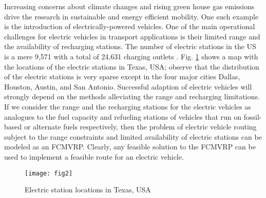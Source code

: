 \documentclass[letterpaper, 10pt, conference]{ieeeconf}
\begin{document}
Increasing concerns about climate changes and rising green house gas emissions drive the research in sustainable and energy efficient mobility. One such example is the introduction of electrically-powered vehicles. One of the main operational challenges for electric vehicles in transport applications is their limited range and the availability of recharging stations. The number of electric stations in the US is a mere 9,571 with a total of 24,631 charging outlets \cite{USDOE}. Fig. \ref{fig:map} shows a map with the locations of the electric stations in Texas, USA; observe that the distribution of the electric stations is very sparse except in the four major cities Dallas, Houston, Austin, and San Antonio. Successful adaption of electric vehicles will strongly depend on the methods alleviating the range and recharging limitations. If we consider the range and the recharging stations for the electric vehicles as analogues to the fuel capacity and refueling stations of vehicles that run on fossil-based or alternate fuels respectively, then the problem of electric vehicle routing subject to the range constraints and limited availability of electric stations can be modeled as an FCMVRP. Clearly, any feasible solution to the FCMVRP can be used to implement a feasible route for an electric vehicle. 

\begin{figure}
\centering
\texttt{[image: fig2]}
\caption{Electric station locations in Texas, USA \cite{USDOE}}
 \label{fig:map}
\end{figure}
\end{document}

